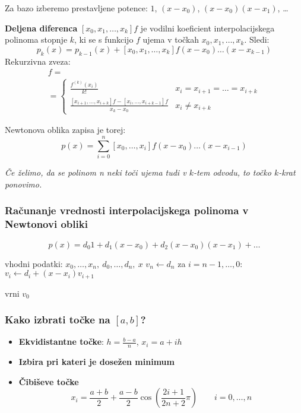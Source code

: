 \begin{multicols}{5}
Za bazo izberemo prestavljene potence: $1$, $(x-x_0)$, $(x-x_0)(x-x_1)$, \dots  


\textbf{Deljena diferenca} $[x_0, x_1, \dots, x_k] f$ je vodilni koeficient interpolacijskega polinoma
stopnje $k$, ki se s funkcijo $f$ ujema v točkah $x_0, x_1, \dots, x_k$. Sledi:
\[ p_k(x) = p_{k-1}(x) + [x_0, x_1, \dots, x_k] f (x-x_0)\dots (x-x_{k-1})\]
Rekurzivna zveza:
\begin{multline*}
    [x_i, x_{i+1}, \dots, x_{i+k}]f = \\
    = \begin{cases}
        \frac{f^{(k)}(x_i)}{k!} & {\scriptstyle x_i = x_{i+1} = \dots = x_{i+k}} \\
        \frac{[x_{i+1}, \dots, x_{i+k}]f- [x_i, \dots, x_{i+k-1}]f}{x_k-x_0} & {\scriptstyle x_i \neq x_{i+k} }
    \end{cases} 
\end{multline*} 

Newtonova oblika zapisa je torej:
\[ p(x) = \sum_{i=0}^n [x_0, \dots, x_i]f (x-x_0)\dots (x-x_{i-1}) \]

\textit{Če želimo, da se polinom n neki toči ujema tudi v $k$-tem odvodu, to točko $k$-krat ponovimo.}

\subsubsection*{Računanje vrednosti interpolacijskega polinoma v Newtonovi obliki}
\[ p(x) = d_0 1 + d_1(x-x_0) + d_2(x-x_0)(x-x_1) + \dots \]

\begin{koda}
vhodni podatki: $x_0, \dots, x_n, \ d_0, \dots, d_n, \ x$
$v_n \leftarrow d_n$
za $i = n-1, \dots, 0$:
    $v_i \leftarrow d_i + (x-x_i) v_{i+1}$

vrni $v_0$
\end{koda}

\subsubsection*{Kako izbrati točke na $[a,b]$?}
\begin{itemize}
    \item \textbf{Ekvidistantne točke}: $h = \frac{b-a}{n}$, $x_i = a + ih$
    \item \textbf{Izbira pri kateri je dosežen minimum}
    \item \textbf{Čibiševe točke}
    \[ x_i = \frac{a+b}{2} + \frac{a-b}{2}\cos\left(\frac{2i+1}{2n+2} \pi\right) \qquad i = 0, \dots, n\]
\end{itemize}



\end{multicols}
